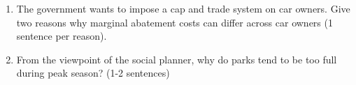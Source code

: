 \documentclass[11pt]{article}
\newcommand{\answer}[1]{\iftoggle{INCLUDEANSWERS}{{\color{violet!70!white}\textbf{Solution:} #1}}{} }
\newcommand{\points}[1]{\iftoggle{INCLUDEPOINTS}{{\color{blue!70!white}(#1 pts.)}}{}}
\begin{document}
\begin{enumerate}
  \item \points{10} The government wants to impose a cap and trade system on car owners. Give two reasons why marginal abatement costs can differ across car owners (1 sentence per reason). 
  
  \answer{Open-ended question. Acceptable answers include: some people have older or bigger cars that pollute more while others have Teslas which pollute via the electrical grid. People differ in their opportunity cost of driving (e.g. someone who lives near a bus can more easily drive less).}
  
  \item \points{10} From the viewpoint of the social planner, why do parks tend to be too full during peak season? (1-2 sentences)
  
  \answer{This is a classic example of the tragedy of the commons. Each individual only cares about their benefit of going to the park and don't consider the negative externality they're imposing on the other park attendees.}
  
\end{enumerate}
\end{document}

